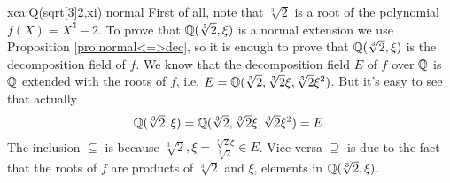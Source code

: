 \begin{sol}{xca:Q(sqrt[3]{2},xi) normal}
First of all, note that $\sqrt[3]{2}$ is a root of
the polynomial $f(X)=X^3-2$.
To prove that $\mathbb{Q}(\sqrt[3]{2},\xi)$ is a normal extension 
we use Proposition \ref{pro:normal<=>dec},
so it is enough to prove
that $\mathbb{Q}(\sqrt[3]{2},\xi)$ is the decomposition field of $f$.
We know that the decomposition field $E$ of $f$ over $\mathbb{Q}$ is
$\mathbb{Q}$ extended with the roots of $f$, i.e.
$E=\mathbb{Q}(\sqrt[3]{2},\sqrt[3]{2}\xi,\sqrt[3]{2}\xi^2)$.
But it's easy to see that actually 
\[
\mathbb{Q}(\sqrt[3]{2},\xi)=\mathbb{Q}(\sqrt[3]{2},\sqrt[3]{2}\xi,\sqrt[3]{2}\xi^2)=E.
\]
The inclusion $\subseteq$ is because $\sqrt[3]{2},  \xi=\frac{\sqrt[3]{2}\xi}{\sqrt[3]{2}}\in E$. 
Vice versa $\supseteq$ is due to the fact that 
the roots of $f$ are products of $\sqrt[3]{2}$ and $\xi$, elements in $\mathbb{Q}(\sqrt[3]{2},\xi)$.
\end{sol}


